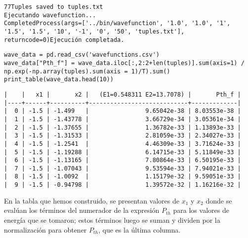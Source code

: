 \documentclass[11pt]{article}
\begin{document}
\label{org9975608}
\begin{verbatim}
77Tuples saved to tuples.txt
Ejecutando wavefunction...
CompletedProcess(args=['../bin/wavefunction', '1.0', '1.0', '1', '1.5', '1.5', '10', '-1', '0', '50', 'tuples.txt'], returncode=0)Ejecución completada.
\end{verbatim}

\begin{verbatim}
wave_data = pd.read_csv('wavefunctions.csv')
wave_data["Pth_f"] = wave_data.iloc[:,2:2+len(tuples)].sum(axis=1) / np.exp(-np.array(tuples).sum(axis = 1)/T).sum()
print_table(wave_data.head(10))
\end{verbatim}

\label{orga9bc4df}
\begin{verbatim}
|    |   x1 |       x2 |   (E1=0.548311 E2=13.7078) |       Pth_f |
|----+------+----------+----------------------------+-------------|
|  0 | -1.5 | -1.499   |                9.65042e-38 | 8.03553e-38 |
|  1 | -1.5 | -1.43778 |                3.66729e-34 | 3.05361e-34 |
|  2 | -1.5 | -1.37655 |                1.36782e-33 | 1.13893e-33 |
|  3 | -1.5 | -1.31533 |                2.81059e-33 | 2.34027e-33 |
|  4 | -1.5 | -1.2541  |                4.46309e-33 | 3.71624e-33 |
|  5 | -1.5 | -1.19288 |                6.14715e-33 | 5.11849e-33 |
|  6 | -1.5 | -1.13165 |                7.80864e-33 | 6.50195e-33 |
|  7 | -1.5 | -1.07043 |                9.53594e-33 | 7.94021e-33 |
|  8 | -1.5 | -1.0092  |                1.15179e-32 | 9.59051e-33 |
|  9 | -1.5 | -0.94798 |                1.39572e-32 | 1.16216e-32 |
\end{verbatim}

En la tabla que hemos construido, se presentan valores de \(x_1\) y \(x_2\)
donde se evalúan los términos del numerador de la expresión \(P_{th}\) para los valores de
energía que se tomaron; estos términos luego se suman y dividen por la
normalización para obtener \(P_{th}\), que es la última columna.
\end{document}
